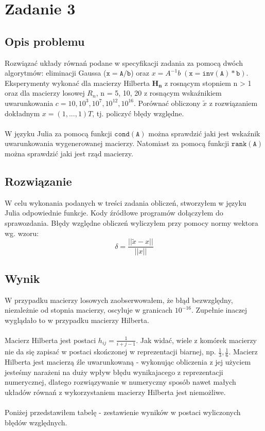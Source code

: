 \section{Zadanie 3}
\subsection{Opis problemu}
Rozwiązać układy równań podane w specyfikacji zadania za pomocą dwóch algorytmów: eliminacji Gaussa ($ \mathtt{x=A/b} $) oraz $ x = A^{-1}b\; (\mathtt{x=inv(A)*b}) $. Eksperymenty wykonać dla macierzy Hilberta $\mathbf{H_n}$ z rosnącym stopniem n > 1 oraz dla macierzy losowej $R_n$, n = 5, 10, 20 z rosnącym wskaźnikiem uwarunkowania $ c = 10, 10^3, 10^7, 10^{12}, 10^{16} $. Porównać obliczony $\tilde{x}$ z rozwiązaniem dokładnym $ x = (1, . . . , 1)T $, tj. policzyć błędy względne. \\ \\
W języku Julia za pomocą funkcji $ \mathtt{cond(A)} $ można sprawdzić jaki jest wskaźnik uwarunkowania wygenerowanej macierzy. Natomiast za pomocą funkcji $ \mathtt{rank(A)} $ można sprawdzić jaki jest rząd macierzy.
\subsection{Rozwiązanie}
W celu wykonania podanych w treści zadania obliczeń, stworzyłem w języku Julia odpowiednie funkcje. Kody źródłowe programów dołączyłem do sprawozdania. Błędy względne obliczeń wyliczyłem przy pomocy normy wektora wg. wzoru:
$$ \delta = \frac{|| \widetilde{x} - x ||}{||x||} $$
\subsection{Wynik}
W przypadku macierzy losowych zaobserwowałem, że błąd bezwzględny, niezależnie od stopnia macierzy, oscyluje w granicach $ 10^{-16} $. Zupełnie inaczej wyglądało to w przypadku macierzy Hilberta. \\\\
Macierz Hilberta jest postaci $ h_{ij} = \frac{1}{i + j - 1}$. Jak widać, wiele z komórek macierzy nie da się zapisać w postaci skończonej w reprezentacji biarnej, np. $ \frac{1}{3}, \frac{1}{6} $. Macierz Hilberta jest macierzą źle uwarunkowaną - wykonując obliczenia z jej użyciem jesteśmy narażeni na duży wpływ błędu wynikajacego z reprezentacji numerycznej, dlatego rozwiązywanie w numeryczny sposób nawet małych układów równań z wykorzystaniem macierzy Hilberta jest niemożliwe. \\\\
Poniżej przedstawiłem tabelę - zestawienie wyników w postaci wyliczonych błędów względnych. \\
\begin{center}

\end{center}

